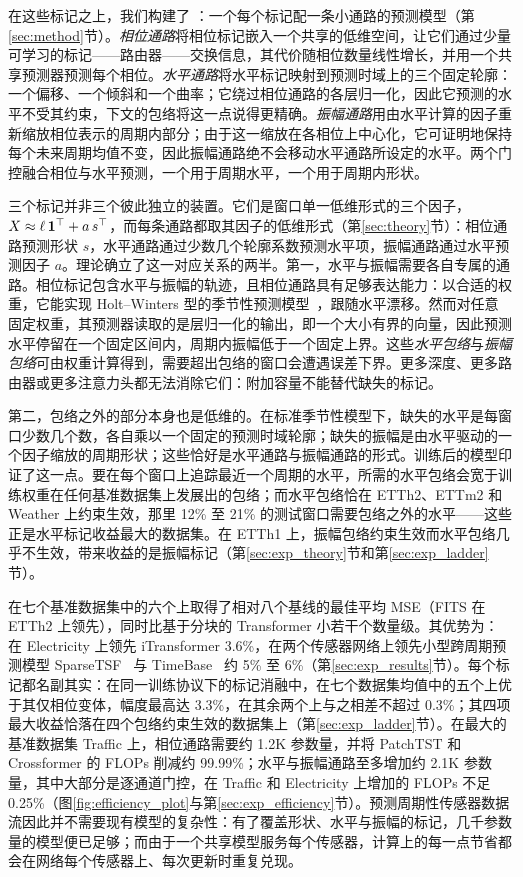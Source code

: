 {\fakeparagraph{\sysplus}
在这些标记之上，我们构建了 \textbf{\sysplus}：一个每个标记配一条小通路的预测模型（第\ref{sec:method}节）。\emph{相位通路}将相位标记嵌入一个共享的低维空间，让它们通过少量可学习的标记——路由器——交换信息，其代价随相位数量线性增长，并用一个共享预测器预测每个相位。\emph{水平通路}将水平标记映射到预测时域上的三个固定轮廓：一个偏移、一个倾斜和一个曲率；它绕过相位通路的各层归一化，因此它预测的水平不受其约束，下文的包络将这一点说得更精确。\emph{振幅通路}用由水平计算的因子重新缩放相位表示的周期内部分；由于这一缩放在各相位上中心化，它可证明地保持每个未来周期均值不变，因此振幅通路绝不会移动水平通路所设定的水平。两个门控融合相位与水平预测，一个用于周期水平，一个用于周期内形状。

三个标记并非三个彼此独立的装置。它们是窗口单一低维形式的三个因子，$X\approx\ell\,\mathbf 1^\top+a\,s^\top$，而每条通路都取其因子的低维形式（第\ref{sec:theory}节）：相位通路预测形状 $s$，水平通路通过少数几个轮廓系数预测水平项，振幅通路通过水平预测因子 $a$。理论确立了这一对应关系的两半。第一，水平与振幅需要各自专属的通路。相位标记包含水平与振幅的轨迹，且相位通路具有足够表达能力：以合适的权重，它能实现 Holt--Winters 型的季节性预测模型~\citep{winters1960forecasting}，跟随水平漂移。然而对任意固定权重，其预测器读取的是层归一化的输出，即一个大小有界的向量，因此预测水平停留在一个固定区间内，周期内振幅低于一个固定上界。这些\emph{水平包络}与\emph{振幅包络}可由权重计算得到，需要超出包络的窗口会遭遇误差下界。更多深度、更多路由器或更多注意力头都无法消除它们：附加容量不能替代缺失的标记。

第二，包络之外的部分本身也是低维的。在标准季节性模型下，缺失的水平是每窗口少数几个数，各自乘以一个固定的预测时域轮廓；缺失的振幅是由水平驱动的一个因子缩放的周期形状；这些恰好是水平通路与振幅通路的形式。训练后的模型印证了这一点。要在每个窗口上追踪最近一个周期的水平，所需的水平包络会宽于训练权重在任何基准数据集上发展出的包络；而水平包络恰在 ETTh2、ETTm2 和 Weather 上约束生效，那里 12\% 至 21\% 的测试窗口需要包络之外的水平——这些正是水平标记收益最大的数据集。在 ETTh1 上，振幅包络约束生效而水平包络几乎不生效，带来收益的是振幅标记（第\ref{sec:exp_theory}节和第\ref{sec:exp_ladder}节）。

\sysplus 在七个基准数据集中的六个上取得了相对八个基线的最佳平均 MSE（FITS 在 ETTh2 上领先），同时比基于分块的 Transformer 小若干个数量级。其优势为：在 Electricity 上领先 iTransformer 3.6\%，在两个传感器网络上领先小型跨周期预测模型 SparseTSF~\citep{lin2024sparsetsf} 与 TimeBase~\citep{huang2025timebase} 约 5\% 至 6\%（第\ref{sec:exp_results}节）。每个标记都名副其实：在同一训练协议下的标记消融中，\sysplus 在七个数据集均值中的五个上优于其仅相位变体，幅度最高达 3.3\%，在其余两个上与之相差不超过 0.3\%；其四项最大收益恰落在四个包络约束生效的数据集上（第\ref{sec:exp_ladder}节）。在最大的基准数据集 Traffic 上，相位通路需要约 1.2K 参数量，并将 PatchTST 和 Crossformer 的 FLOPs 削减约 99.99\%；水平与振幅通路至多增加约 2.1K 参数量，其中大部分是逐通道门控，在 Traffic 和 Electricity 上增加的 FLOPs 不足 0.25\%（图\ref{fig:efficiency_plot}与第\ref{sec:exp_efficiency}节）。预测周期性传感器数据流因此并不需要现有模型的复杂性：有了覆盖形状、水平与振幅的标记，几千参数量的模型便已足够；而由于一个共享模型服务每个传感器，计算上的每一点节省都会在网络每个传感器上、每次更新时重复兑现。

}
